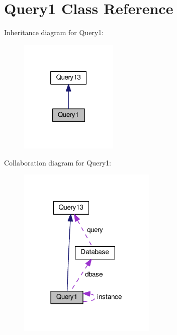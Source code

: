 \hypertarget{classQuery1}{}\section{Query1 Class Reference}
\label{classQuery1}


Inheritance diagram for Query1\+:\nopagebreak
\begin{figure}[H]
\begin{center}
\leavevmode
\includegraphics[width=133pt]{classQuery1__inherit__graph}
\end{center}
\end{figure}


Collaboration diagram for Query1\+:\nopagebreak
\begin{figure}[H]
\begin{center}
\leavevmode
\includegraphics[width=186pt]{classQuery1__coll__graph}
\end{center}
\end{figure}
